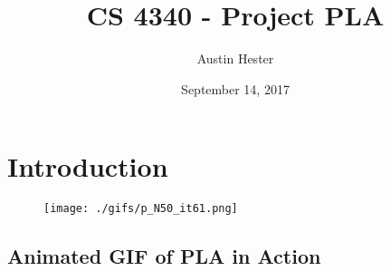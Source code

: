 \documentclass{article}
\begin{document}
\title{CS 4340 - Project PLA}
\author{Austin Hester}
\date{September 14, 2017}
\maketitle

\makeatletter
\def\@seccntformat#1{%
	 \expandafter\ifx\csname c@#1\endcsname\c@section\else
	  \csname the#1\endcsname\quad
  \fi}
\makeatother



\section*{Introduction}


\begin{figure}[h]
	\centering
	\texttt{[image: ./gifs/p\_N50\_it61.png]}
\end{figure}

\newpage
\begin{center}
\section*{Animated GIF of PLA in Action}
\hspace{-4em} 
\end{center}


\newpage
\end{document}
